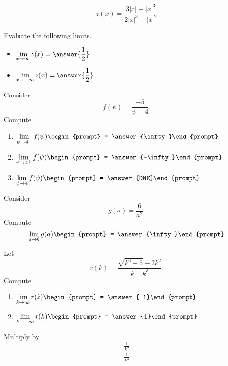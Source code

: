 \documentclass[handout]{ximera}
\begin{document}
\begin{exercise}
\[
z(x) = \frac{3|x|+|x|^3}{2|x|^3 - |x|^2}
\]

Evaluate the following limits.  

\begin{itemize}

\item $\displaystyle\lim_{x \to \infty} z(x) = \answer{\frac{1}{2}}$

\item $\displaystyle\lim_{x \to -\infty} z(x) = \answer{\frac{1}{2}}$

\end{itemize}

\end{exercise}

\begin{exercise}
Consider 
\[
f(\psi) = \frac{-5}{\psi -4}.
\]
Compute
\begin{enumerate}
\item $\displaystyle\lim_{\psi\to 4^- } f(\psi) \begin{prompt} = \answer{\infty}\end{prompt}$
\item $\displaystyle\lim_{\psi\to 4^+ } f(\psi) \begin{prompt} = \answer{-\infty}\end{prompt}$
\item $\displaystyle\lim_{\psi\to 4 } f(\psi) \begin{prompt} = \answer{DNE}\end{prompt}$
\end{enumerate}
\end{exercise}

\begin{exercise}
Consider 
\[
g(a) = \frac{6}{a^2}.
\]
Compute
\[ \displaystyle\lim_{a \to 0 } g(a) \begin{prompt} = \answer{\infty}\end{prompt} \]

\end{exercise}

\begin{exercise}
Let 
\[
r(k) = \frac{\sqrt{k^6+5}-2 k^2}{k-k^3}.
\]
Compute
\begin{enumerate}
\item $\displaystyle\lim_{k\to \infty} r(k) \begin{prompt} = \answer{-1}\end{prompt}$
\item $\displaystyle\lim_{k\to -\infty}r(k) \begin{prompt} = \answer{1}\end{prompt}$
\end{enumerate}
\begin{hint}
Multiply by
\[
\frac{\frac{1}{k^3}}{\frac{1}{k^3}}
\]
\end{hint}
\end{exercise}
\end{document}
